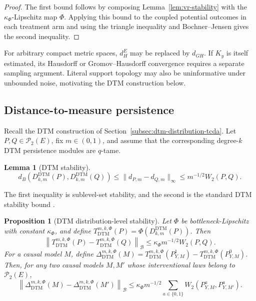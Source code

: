 \documentclass[11pt,a4paper]{article}
\theoremstyle{plain}
\newtheorem{proposition}[theorem]{Proposition}
\newtheorem{lemma}[theorem]{Lemma}
\theoremstyle{definition}
\theoremstyle{remark}
\newcommand{\1}{\mathbbm{1}}
\begin{document}
\begin{proof}
The first bound follows by composing
Lemma~\ref{lem:vr-stability} with the
\(\kappa_\Phi\)-Lipschitz map \(\Phi\). Applying this bound to
the coupled potential outcomes in each treatment arm and using
the triangle inequality and Bochner--Jensen gives the second
inequality.
\end{proof}

For arbitrary compact metric spaces, \(d_H^E\) may be replaced by \(d_{GH}\). If \(K_y\) is itself estimated, its Hausdorff or Gromov--Hausdorff convergence requires a separate sampling argument. Literal support topology may also be uninformative under unbounded noise, motivating the DTM construction below.

\subsection{Distance-to-measure persistence}
\label{subsec:dtm-stability}

Recall the DTM construction of
Section~\ref{subsec:dtm-distribution-tcda}. Let
\(P,Q\in\mathcal P_2(E)\), fix \(m\in(0,1)\), and assume that the corresponding degree-\(k\) DTM persistence modules are \(q\)-tame.

\begin{lemma}[DTM stability]
\label{lem:dtm-stability}
\[
d_B\left(
D_{k,m}^{\mathrm{DTM}}(P),
D_{k,m}^{\mathrm{DTM}}(Q)
\right)
\leq
\|d_{P,m}-d_{Q,m}\|_\infty
\leq
m^{-1/2}W_2(P,Q).
\]
\end{lemma}

The first inequality is sublevel-set stability, and the second is the standard DTM stability bound
\citep{chazalcohensteinermrigot2011,buchetetal2016}.

\begin{proposition}[DTM distribution-level stability]
\label{prop:dtm-causal-stability}
Let \(\Phi\) be bottleneck-Lipschitz with constant \(\kappa_\Phi\), and define
\(T_{\mathrm{DTM}}^{m,k,\Phi}(P) = \Phi(D_{k,m}^{\mathrm{DTM}}(P))\). Then
\[
\left\|
T_{\mathrm{DTM}}^{m,k,\Phi}(P)
-
T_{\mathrm{DTM}}^{m,k,\Phi}(Q)
\right\|_{\mathcal B}
\leq
\kappa_\Phi m^{-1/2}W_2(P,Q).
\]
For a causal model \(M\), define
\(\Delta_{\mathrm{DTM}}^{m,k,\Phi}(M) = T_{\mathrm{DTM}}^{m,k,\Phi}(P_{Y,M}^1) - T_{\mathrm{DTM}}^{m,k,\Phi}(P_{Y,M}^0)\). Then, for any two causal models \(M,M'\) whose interventional laws belong to \(\mathcal P_2(E)\),
\[
\left\|
\Delta_{\mathrm{DTM}}^{m,k,\Phi}(M)
-
\Delta_{\mathrm{DTM}}^{m,k,\Phi}(M')
\right\|_{\mathcal B}
\leq
\kappa_\Phi m^{-1/2}
\sum_{a\in\{0,1\}}
W_2(P_{Y,M}^a,P_{Y,M'}^a).
\]
\end{proposition}
\end{document}
